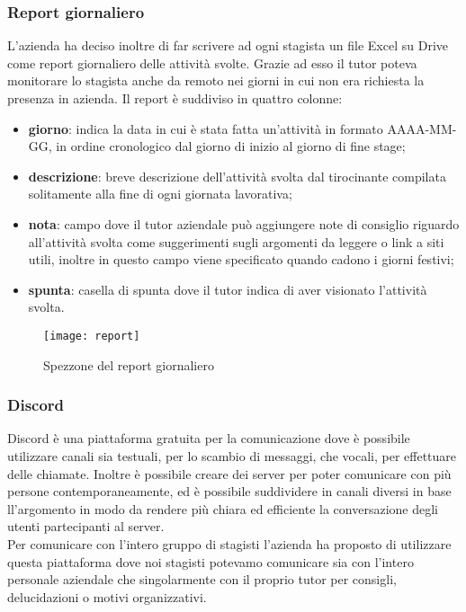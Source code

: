 \subsubsection{Report giornaliero}
\label{subsubsec:report}
L'azienda ha deciso inoltre di far scrivere ad ogni stagista un file Excel su Drive come report giornaliero delle attività svolte. Grazie ad esso il tutor poteva monitorare lo stagista anche da remoto nei giorni in cui non era richiesta la presenza in azienda. Il report è suddiviso in quattro colonne:
\begin{itemize}
	\item \textbf{giorno}: indica la data in cui è stata fatta un'attività in formato AAAA-MM-GG, in ordine cronologico dal giorno di inizio al giorno di fine stage;
	\item \textbf{descrizione}: breve descrizione dell'attività svolta dal tirocinante compilata solitamente alla fine di ogni giornata lavorativa;
	\item \textbf{nota}: campo dove il tutor aziendale può aggiungere note di consiglio riguardo all'attività svolta come suggerimenti sugli argomenti da leggere o link a siti utili, inoltre in questo campo viene specificato quando cadono i giorni festivi;
	\item \textbf{spunta}: casella di spunta dove il tutor indica di aver visionato l'attività svolta.
\end{itemize}

\begin{figure}[H]
	\begin{center}
		\texttt{[image: report]}
		\caption{Spezzone del report giornaliero}
	\end{center}
\end{figure}


\subsubsection{Discord}
\label{subsubsec:discord}
Discord è una piattaforma gratuita per la comunicazione dove è possibile utilizzare canali sia testuali, per lo scambio di messaggi, che vocali, per effettuare delle chiamate. Inoltre è possibile creare dei server per poter comunicare con più persone contemporaneamente, ed è possibile suddividere in canali diversi in base ll'argomento in modo da rendere più chiara ed efficiente la conversazione degli utenti partecipanti al server.\\
Per comunicare con l'intero gruppo di stagisti l'azienda ha proposto di utilizzare questa piattaforma dove noi stagisti potevamo comunicare sia con l'intero personale aziendale che singolarmente con il proprio tutor per consigli, delucidazioni o motivi organizzativi.

